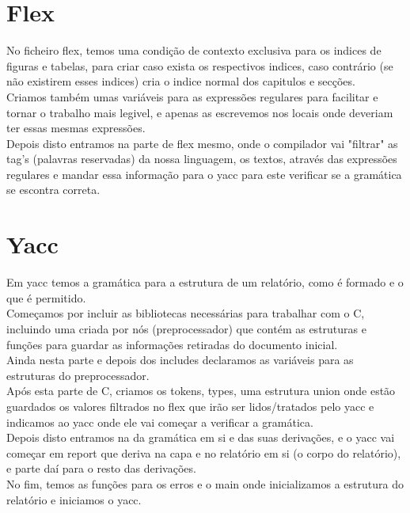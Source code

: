 \documentclass[11pt, a4paper]{report}
\begin{document}
\section{Flex}
No ficheiro flex, temos uma condição de contexto exclusiva para os indices de figuras e tabelas, para criar caso exista os respectivos indices, caso contrário (se não existirem esses indices) cria o indice normal dos capitulos e secções.\\
Criamos também umas variáveis para as expressões regulares para facilitar e tornar o trabalho mais legivel, e apenas as escrevemos nos locais onde deveriam ter essas mesmas expressões.\\
Depois disto entramos na parte de flex mesmo, onde o compilador vai "filtrar" as tag's (palavras reservadas) da nossa linguagem, os textos, através das expressões regulares e mandar essa informação para o yacc para este verificar se a gramática se escontra correta.\\
\section{Yacc}
Em yacc temos a gramática para a estrutura de um relatório, como é formado e o que é permitido.\\
Começamos por incluir as bibliotecas necessárias para trabalhar com o C, incluindo uma criada por nós (preprocessador) que contém as estruturas e funções para guardar as informações retiradas do documento inicial.\\
Ainda nesta parte e depois dos includes declaramos as variáveis para as estruturas do preprocessador.\\
Após esta parte de C, criamos os tokens, types, uma estrutura union onde estão guardados os valores filtrados no flex que irão ser lidos/tratados pelo yacc e indicamos ao yacc onde ele vai começar a verificar a gramática.\\
Depois disto entramos na da gramática em si e das suas derivações, e o yacc vai começar em report que deriva na capa e no relatório em si (o corpo do relatório), e parte daí para o resto das derivações.\\
No fim, temos as funções para os erros e o main onde inicializamos a estrutura do relatório e iniciamos o yacc.\\
\end{document}
